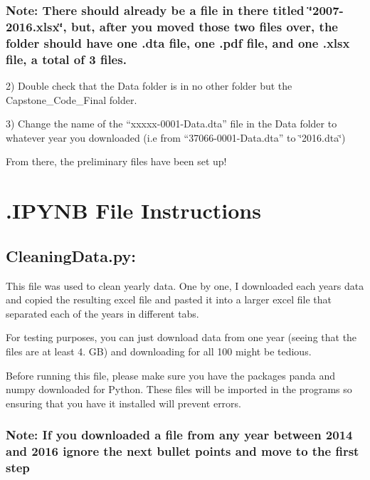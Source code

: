\subsubsection*{Note\+: There should already be a file in there titled \char`\"{}2007-\/2016.\+xlsx\char`\"{}, but, after you moved those two files over, the folder should have one .dta file, one .pdf file, and one .xlsx file, a total of 3 files.}

2) Double check that the Data folder is in no other folder but the Capstone\+\_\+\+Code\+\_\+\+Final folder.

3) Change the name of the “xxxxx-\/0001-\/\+Data.dta” file in the Data folder to whatever year you downloaded (i.\+e from “37066-\/0001-\/\+Data.dta” to \char`\"{}2016.\+dta\char`\"{})

From there, the preliminary files have been set up!

\section*{.I\+P\+Y\+N\+B File Instructions}

\subsection*{Cleaning\+Data.\+py\+:}


\begin{DoxyItemize}
\item This file was used to clean yearly data. One by one, I downloaded each year\textquotesingle{}s data and copied the resulting excel file and pasted it into a larger excel file that separated each of the years in different tabs.
\item For testing purposes, you can just download data from one year (seeing that the files are at least 4. G\+B) and downloading for all 100 might be tedious.
\item Before running this file, please make sure you have the packages panda and numpy downloaded for Python. These files will be imported in the programs so ensuring that you have it installed will prevent errors.
\end{DoxyItemize}

\subsubsection*{Note\+: If you downloaded a file from any year between 2014 and 2016 ignore the next bullet points and move to the first step}


